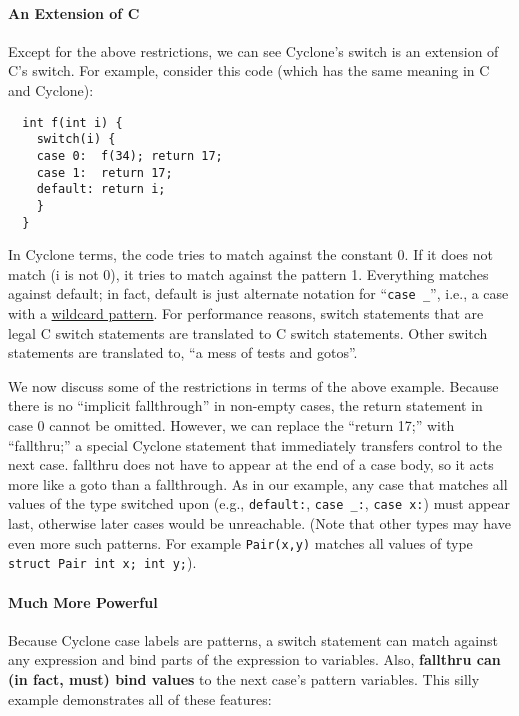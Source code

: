 \paragraph{An Extension of C}

Except for the above restrictions, we can see Cyclone's switch is an
extension of C's switch.  For example, consider this code (which has
the same meaning in C and Cyclone):

\begin{verbatim}
  int f(int i) {
    switch(i) {
    case 0:  f(34); return 17;
    case 1:  return 17;
    default: return i;
    }
  }
\end{verbatim}

In Cyclone terms, the code tries to match against the constant 0.  If
it does not match (i is not 0), it tries to match against the pattern
1.  Everything matches against default; in fact, default is just
alternate notation for ``\texttt{case _}'', i.e., a case with a
\hyperlink{wild_pat}{wildcard pattern}.  For performance reasons,
switch statements that are legal C switch statements are translated to
C switch statements.  Other switch statements are translated to,
``a mess of tests and gotos''.

We now discuss some of the restrictions in terms of the above example.
Because there is no ``implicit fallthrough'' in non-empty cases, the
return statement in case 0 cannot be omitted.  However, we can replace
the ``return 17;'' with ``fallthru;'' a special Cyclone statement that
immediately transfers control to the next case.  fallthru does not
have to appear at the end of a case body, so it acts more like a goto
than a fallthrough.  As in our example, any case that matches all
values of the type switched upon (e.g., \texttt{default:},
\texttt{case _:},
\texttt{case x:}) must appear last, otherwise later cases would be
unreachable.  (Note that other types may have even more such patterns.
For example \texttt{Pair(x,y)} matches all values of type 
\texttt{struct Pair {int x; int y};}).

\paragraph{Much More Powerful}

Because Cyclone case labels are patterns, a switch statement can match
against any expression and bind parts of the expression to variables.
Also, \textbf{fallthru can (in fact, must) bind values} to the next
case's pattern variables.  This silly example demonstrates all of
these features:


